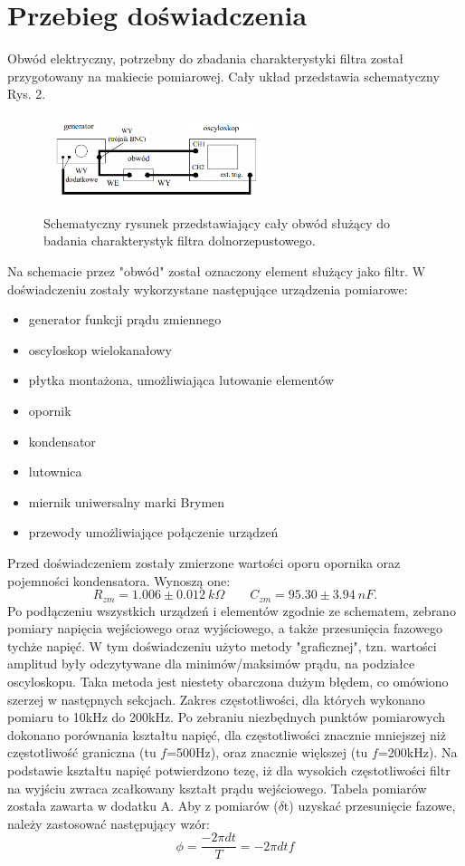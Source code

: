 \documentclass[10pt,a4paper]{article}
\begin{document}
\section*{Przebieg doświadczenia}
Obwód elektryczny, potrzebny do zbadania charakterystyki filtra został przygotowany na makiecie pomiarowej. Cały układ przedstawia schematyczny  Rys. 2.

\begin{figure}[ht!]	
	\begin{center}
		\includegraphics[width = 0.6\textwidth]{obwod.png}
		\caption{Schematyczny rysunek przedstawiający cały obwód służący do badania charakterystyk filtra dolnorzepustowego.}
	\end{center}
\end{figure}	

Na schemacie przez "obwód" został oznaczony element służący jako filtr.
W doświadczeniu zostały wykorzystane następujące urządzenia pomiarowe:
\begin{itemize}
\item generator funkcji prądu zmiennego
\item oscyloskop wielokanałowy
\item płytka montażona, umożliwiająca lutowanie elementów
\item opornik
\item kondensator
\item lutownica
\item miernik uniwersalny marki Brymen
\item przewody umożliwiające połączenie urządzeń
\end{itemize}
Przed doświadczeniem zostały zmierzone wartości oporu opornika oraz pojemności kondensatora. Wynoszą one:
$$ R_{zm} = 1.006 \pm 0.012 \ k\Omega \qquad C_{zm} = 95.30 \pm 3.94 \ nF. $$
Po podłączeniu wszystkich urządzeń i elementów zgodnie ze schematem, zebrano pomiary napięcia wejściowego oraz wyjściowego, a także przesunięcia fazowego tychże napięć. W tym doświadczeniu użyto metody "graficznej", tzn. wartości amplitud były odczytywane dla minimów/maksimów prądu, na podziałce oscyloskopu. Taka metoda jest niestety obarczona dużym błędem, co omówiono szerzej w następnych sekcjach.
Zakres częstotliwości, dla których wykonano pomiaru to 10kHz do 200kHz. Po zebraniu niezbędnych punktów pomiarowych dokonano porównania kształtu napięć, dla częstotliwości znacznie mniejszej niż częstotliwość graniczna (tu $f$=500Hz), oraz znacznie większej (tu $f$=200kHz). Na podstawie kształtu napięć potwierdzono tezę, iż dla wysokich częstotliwości filtr na wyjściu zwraca zcałkowany kształt prądu wejściowego. 
Tabela pomiarów została zawarta w dodatku A. Aby z pomiarów ($\delta$t) uzyskać przesunięcie fazowe, należy zastosować następujący wzór:
$$\phi = \frac{-2\pi dt}{T} = -2\pi dt f $$
\end{document}
